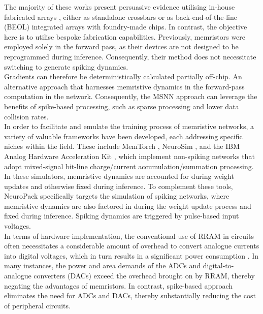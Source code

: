 \noindent The majority of these works present persuasive evidence utilising in-house fabricated arrays \cite{molter2016generalized}, either as standalone crossbars or as back-end-of-the-line (BEOL) integrated arrays with foundry-made chips. In contrast, the objective here is to utilise bespoke fabrication capabilities. Previously, memristors were employed solely in the forward pass, as their devices are not designed to be reprogrammed during inference. Consequently, their method does not necessitate switching to generate spiking dynamics.\\

\noindent Gradients can therefore be deterministically calculated partially off-chip. An alternative approach that harnesses memristive dynamics in the forward-pass computation in the network. Consequently, the MSNN approach can leverage the benefits of spike-based processing, such as sparse processing and lower data collision rates. \\

\noindent In order to facilitate and emulate the training process of memristive networks, a variety of valuable frameworks have been developed, each addressing specific niches within the field. These include MemTorch \cite{lammie2022memtorch}, NeuroSim \cite{chen2018neurosim}, and the IBM Analog Hardware Acceleration Kit \cite{rasch2021flexible}, which implement non-spiking networks that adopt mixed-signal bit-line charge/current accumulation/summation processing.\\ 

\noindent In these simulators, memristive dynamics are accounted for during weight updates and otherwise fixed during inference. To complement these tools, NeuroPack \cite{huang2022neuropack} specifically targets the simulation of spiking networks, where memristive dynamics are also factored in during the weight update process and fixed during inference. Spiking dynamics are triggered by pulse-based input voltages. \\

\noindent In terms of hardware implementation, the conventional use of RRAM in circuits often necessitates a considerable amount of overhead to convert analogue currents into digital voltages, which in turn results in a significant power consumption \cite{cai2019fully}. In many instances, the power and area demands of the ADCs and digital-to-analogue converters (DACs) exceed the overhead brought on by RRAM, thereby negating the advantages of memristors. In contrast, spike-based approach eliminates the need for ADCs and DACs, thereby substantially reducing the cost of peripheral circuits.



